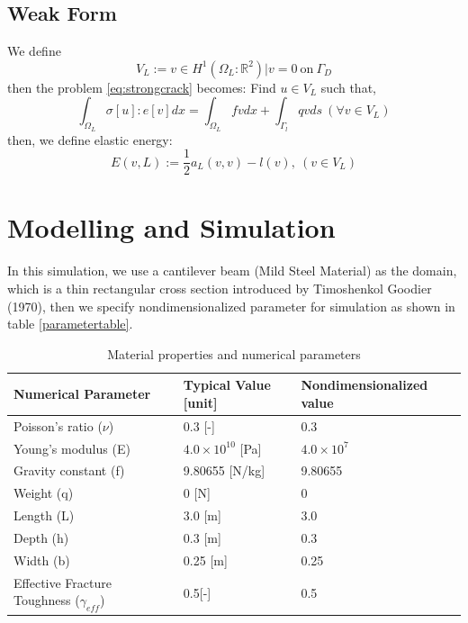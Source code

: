 \documentclass[a4paper,11pt]{article}
\newcommand{\R}{\mathbb{R}}
\begin{document}
\subsection{Weak Form}
We define $$V_L := {v \in H^1(\Omega_L : \R^2)| v=0}\ \text{on}\ \Gamma_D$$
then the problem \eqref{eq:strongcrack} becomes:
Find $u\in V_L$ such that,
\begin{equation}\label{eq:weakcrack}
\int_{\Omega_L} \sigma[u] : e[v] dx = \int_{\Omega_L} fv dx + \int_{\Gamma_l} qv ds\ (\forall  v \in V_L)
\end{equation}
then, we define elastic energy:
\begin{equation}\label{eq:elasticen}
E(v,L) := \frac{1}{2}a_L(v,v) - l(v),\ (v\in V_L)
\end{equation}
\newpage
\section{Modelling and Simulation}
In this simulation, we use a cantilever beam (Mild Steel Material) as the domain, which is a thin rectangular cross section introduced by Timoshenkol Goodier (1970), then we specify nondimensionalized parameter for simulation as shown in table \ref{parametertable}.
\begin{table}[h!]
	\centering
	\begin{tabular}{|l|l|l|}
		\hline
		Numerical Parameter & Typical Value [unit] & Nondimensionalized value\\
		\hline
		Poisson's ratio ($\nu$) & 0.3 [-] & 0.3\\
		Young's modulus (E) & $4.0 \times 10^{10}$ [Pa] & $4.0 \times 10^7$\\
		Gravity constant (f) & 9.80655 [N/kg] & 9.80655\\
		Weight (q) & 0 [N] & 0\\
		Length (L) & 3.0 [m] & 3.0\\
		Depth (h) & 0.3 [m] & 0.3\\
		Width (b) & 0.25 [m] & 0.25\\
		Effective Fracture Toughness ($\gamma_{eff}$) & 0.5[-] & 0.5\\
		\hline
	\end{tabular}
\caption{Material properties and numerical parameters}
\label{tab:parametertable}
\end{table}
\newline
\end{document}
